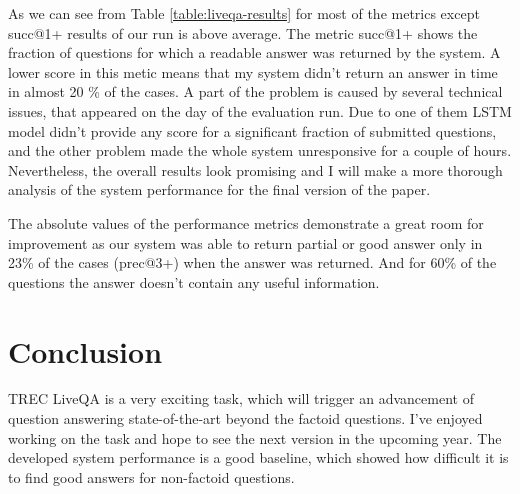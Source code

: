 \documentclass[]{article}
\begin{document}
As we can see from Table \ref{table:liveqa-results} for most of the metrics except succ@1+ results of our run is above average.
The metric succ@1+ shows the fraction of questions for which a readable answer was returned by the system.
A lower score in this metic means that my system didn't return an answer in time in almost 20 \% of the cases.
A part of the problem is caused by several technical issues, that appeared on the day of the evaluation run.
Due to one of them LSTM model didn't provide any score for a significant fraction of submitted questions, and the other problem made the whole system unresponsive for a couple of hours.
Nevertheless, the overall results look promising and I will make a more thorough analysis of the system performance for the final version of the paper.

The absolute values of the performance metrics demonstrate a great room for improvement as our system was able to return partial or good answer only in 23\% of the cases (prec@3+) when the answer was returned.
And for 60\% of the questions the answer doesn't contain any useful information.

\section{Conclusion}
TREC LiveQA is a very exciting task, which will trigger an advancement of question answering state-of-the-art beyond the factoid questions.
I've enjoyed working on the task and hope to see the next version in the upcoming year.
The developed system performance is a good baseline, which showed how difficult it is to find good answers for non-factoid questions.




\end{document}
